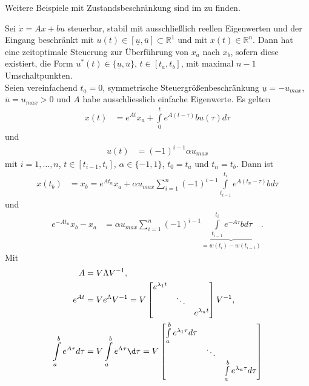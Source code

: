 \begin{remark}
Weitere Beispiele mit Zustandsbeschränkung sind im \cite{geering2007optimal} zu finden.
\end{remark}
\begin{exmp}
Sei $\dot{x}=Ax+bu$ steuerbar, stabil mit ausschließlich reellen Eigenwerten und der Eingang beschränkt mit
$u(t)\in\left[\underline{u},\overline{u}\right]\subset\mathbb{R}^1$ und mit $x(t)\in\mathbb{R}^n$. Dann hat eine zeitoptimale Steuerung zur
Überführung von $x_a$ nach $x_b$, sofern diese existiert, die Form $u^{\ast}(t)\in\{\underline{u},\overline{u}\}$, $t\in[t_a,t_b]$, mit maximal $n-1$
Umschaltpunkten. \\
Seien vereinfachend $t_a=0$, symmetrische Steuergrößenbeschränkung $\underline{u}=-u_{max}$, $\overline{u}=u_{max}>0$ und $A$ habe ausschliesslich
einfache Eigenwerte. Es gelten
\begin{align*}
	x(t) & = e^{At}x_a+\int\limits_0^t e^{A(t-\tau)}bu(\tau)d\tau
\end{align*}
und
\begin{align*}
	u(t) & = (-1)^{i-1}\alpha u_{max}
\end{align*}
mit $i=1,\ldots,n$, $t\in[t_{i-1},t_i]$, $\alpha\in\{-1,1\}$, $t_0=t_a$ und $t_n=t_b$. Dann ist
\begin{align*}
	x(t_b) & = x_b = e^{At_n}x_a + \alpha u_{max}\sum\limits_{i=1}^{n}(-1)^{i-1}\int\limits_{t_{i-1}}^{t_i}e^{A(t_n-\tau)}bd\tau
\end{align*}
und
\begin{align*}
	e^{-At_n}x_b-x_a & = \alpha u_{max}\sum\limits_{i=1}^n(-1)^{i-1}\underbrace{\int\limits_{t_{i-1}}^{t_i}e^{-A\tau}bd\tau }_{=w(t_i)-w(t_{i-1})}.
\end{align*}
Mit 
\begin{align*}
	A & = V\Lambda V^{-1},\\
	e^{At} & = V e^{\Lambda} V^{-1}= V\begin{bmatrix}
	e^{\lambda_1 t}	& 			&\\
					& \ddots 	&\\
					&			& e^{\lambda_n t}
	\end{bmatrix}V^{-1},\\
	\int\limits_{a}^{b}e^{A\tau}d\tau & = V\int\limits_a^b e^{\Lambda \tau}\d\tau = V\begin{bmatrix}
	\int\limits_a^b e^{\lambda_1 \tau}d\tau	& 			&\\
					& \ddots 	&\\
					&			& \int\limits_a^b e^{\lambda_n \tau}d\tau

\end{bmatrix}
\end{align*}
\end{exmp}
